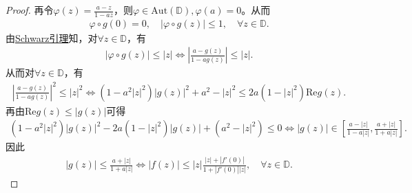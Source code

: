\documentclass[../../main.tex]{subfiles}%
\begin{document}
\begin{proof}
再令$\varphi(z)=\frac{a-z}{1-az}$，则$\varphi\in\mathrm{Aut}(\mathbb{D}),\varphi(a)=0$。从而
\begin{align*}
\varphi\circ g(0)=0,\quad |\varphi\circ g(z)|\leqslant 1,\quad \forall z\in\mathbb{D}.
\end{align*}
由\hyperref[theorem:Schwarz引理-定理4.5.3]{Schwarz引理}知，对$\forall z\in\mathbb{D}$，有
\begin{align*}
|\varphi\circ g(z)|\leqslant |z|\Longleftrightarrow \left|\frac{a-g(z)}{1-ag(z)}\right|\leqslant |z|.
\end{align*}
从而对$\forall z\in\mathbb{D}$，有
\begin{align*}
\left|\frac{a-g(z)}{1-ag(z)}\right|^2\leqslant |z|^2\Longleftrightarrow (1-a^2|z|^2)|g(z)|^2+a^2-|z|^2\leqslant 2a(1-|z|^2)\mathrm{Re}g(z).
\end{align*}
再由$\mathrm{Re}g(z)\leqslant |g(z)|$可得
\begin{align*}
(1-a^2|z|^2)|g(z)|^2-2a(1-|z|^2)|g(z)|+(a^2-|z|^2)\leqslant 0\Longleftrightarrow |g(z)|\in\left[\frac{a-|z|}{1-a|z|},\frac{a+|z|}{1+a|z|}\right].
\end{align*}
因此
\begin{align*}
|g(z)|\leqslant \frac{a+|z|}{1+a|z|}\Longleftrightarrow |f(z)|\leqslant |z|\frac{|z|+|f'(0)|}{1+|f'(0)||z|},\quad \forall z\in\mathbb{D}.
\end{align*}

\end{proof}
\end{document}

